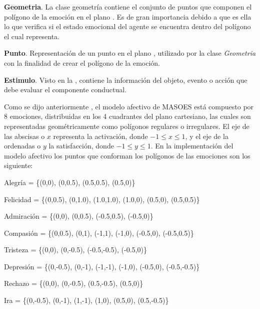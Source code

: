 \textbf{Geometria}. La clase geometría contiene el conjunto de puntos
que componen el polígono de la emoción en el plano \Rcuadrado.
Es de gran importancia debido a que es ella lo que verifica
si el estado emocional del agente se encuentra dentro del
polígono el cual representa.

\textbf{Punto}. Representación de un punto en el plano \Rcuadrado, utilizado por la
clase \textit{Geometria} con la finalidad de crear el polígono de la emoción.

\textbf{Estimulo}. Visto en la , contiene la información
del objeto, evento o acción que debe evaluar el componente conductual.


Como se dijo anteriormente , el modelo afectivo de MASOES está compuesto por 8 emociones,
distribuidas en los 4 cuadrantes del plano cartesiano, las cuales son representadas geométricamente
como polígonos regulares o irregulares.
El eje de las abscisas o $x$ representa la activación,
donde $-1 \leq x \leq 1$,
y el eje de la ordenadas o $y$ la satisfacción, donde $-1 \leq y \leq 1$.
En la implementación del modelo afectivo los puntos que conforman
los polígonos de las emociones son los siguiente:

\espaciodoble

\begin{vinetas}
\item Alegría = \{(0,0), (0,0.5), (0.5,0.5), (0.5,0)\}
\item Felicidad = \{(0,0.5), (0,1.0), (1.0,1.0), (1.0,0), (0.5,0), (0.5,0.5)\}
\item Admiración = \{(0,0), (0,0.5), (-0.5,0.5), (-0.5,0)\}
\item Compasión = \{(0,0.5), (0,1), (-1,1), (-1,0), (-0.5,0), (-0.5,0.5)\}
\item Tristeza = \{(0,0), (0,-0.5), (-0.5,-0.5), (-0.5,0)\}
\item Depresión = \{(0,-0.5), (0,-1), (-1,-1), (-1,0), (-0.5,0), (-0.5,-0.5)\}
\item Rechazo = \{(0,0), (0,-0.5), (0.5,-0.5), (0.5,0)\}
\item Ira = \{(0,-0.5), (0,-1), (1,-1), (1,0), (0.5,0), (0.5,-0.5)\}
\end{vinetas}

